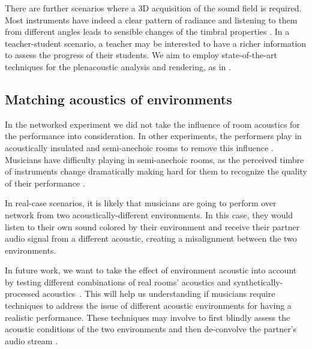There are further scenarios where a 3D acquisition of the sound field is required.  Most instruments have indeed a clear pattern of radiance and listening to them from different angles leads to sensible changes of the timbral properties \cite{CancliniAES}. In a teacher-student scenario, a teacher may be interested to have a richer information to assess the progress of their students. We aim to employ state-of-the-art techniques for the plenacoustic analysis and rendering, as in \cite{Canclini2015}.


\subsection{Matching acoustics of environments}
In the networked experiment we did not take the influence of room acoustics for the performance into consideration. In other experiments, the performers play in acoustically insulated and semi-anechoic rooms to remove this influence \cite{RottondiFeature}. Musicians have difficulty playing in semi-anechoic rooms, as the perceived timbre of instruments change dramatically making hard for them to recognize the quality of their performance \cite{Woszczyk2009}.

In real-case scenarios, it is likely that musicians are going to perform over network from two acoustically-different environments. In this case, they would listen to their own sound colored by their environment and receive their partner audio signal from a different acoustic, creating a misalignment between the two environments.

In future work, we want to take the effect of environment acoustic into account by testing different combinations of real rooms' acoustics and synthetically-processed acoustics~\cite{Boucher15}. This will help us understanding if musicians require techniques to address the issue of different acoustic environments for having a realistic performance. These techniques may involve to first blindly assess the acoustic conditions of the two environments and then de-convolve the partner's audio stream \cite{CancliniRoom}.



